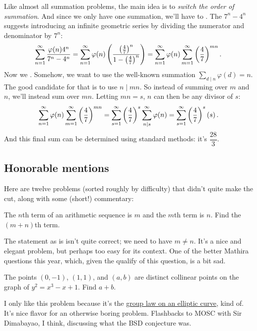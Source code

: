 \documentclass[11pt,paper=letter]{scrartcl}
\begin{document}
Like almost all summation problems, the main idea is to \emph{switch the order of summation}. And since we only have one summation, we'll have to . The $7^n - 4^n$ suggests introducing an infinite geometric series by dividing the numerator and denominator by $7^n$:
$$\sum_{n=1}^{\infty} \frac{\varphi(n)4^n}{7^n - 4^n} = \sum_{n=1}^{\infty} \varphi(n) \left( \frac{\left( \frac47 \right)^n}{1 - \left( \frac47 \right)^n} \right) = \sum_{n=1}^{\infty} \varphi(n) \sum_{m=1}^{\infty} \left( \frac47 \right)^{mn}.$$
Now we . Somehow, we want to use the well-known summation $\sum_{d\mid n}\varphi(d) = n$. The good candidate for that is to use $n \mid mn$. So instead of summing over $m$ and $n$, we'll instead sum over $mn$. Letting $mn = s$, $n$ can then be any divisor of $s$:
$$\sum_{n=1}^{\infty} \varphi(n) \sum_{m=1}^{\infty} \left( \frac47 \right)^{mn} = \sum_{s=1}^{\infty} \left( \frac47 \right)^{s} \sum_{n \mid s}^{\infty} \varphi(n) = \sum_{s=1}^{\infty} \left( \frac47 \right)^{s}\left( s \right).$$
And this final sum can be determined using standard methods: it's $\dfrac{28}{3}$.

\subsection{Honorable mentions}

Here are twelve problems (sorted roughly by difficulty) that didn't quite make the cut, along with some (short!) commentary:

\begin{probboxed}
   The $n$th term of an arithmetic sequence is $m$ and the $m$th term is $n$. Find the $(m+n)$th term.
\end{probboxed}

The statement as is isn't quite correct; we need to have $m \neq n$. It's a nice and elegant problem, but perhaps too easy for its context. One of the better Mathira questions this year, which, given the qualify of this question, is a bit sad.

\begin{probboxed}
   The points $(0, -1)$, $(1, 1)$, and $(a, b)$ are distinct collinear points on the graph of $y^2 = x^3 - x + 1$. Find $a + b$.
\end{probboxed}

I only like this problem because it's the \href{https://en.wikipedia.org/wiki/Elliptic_curve\#The_group_law}{group law on an elliptic curve}, kind of. It's nice flavor for an otherwise boring problem. Flashbacks to MOSC with Sir Dimabayao, I think, discussing what the BSD conjecture was. 
\end{document}
